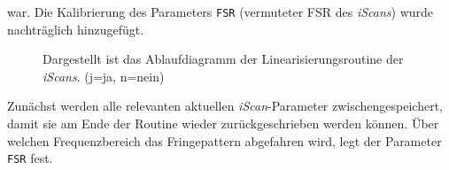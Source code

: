 war. Die Kalibrierung des Parameters \lstinline|FSR| (vermuteter FSR des
\textit{iScans}) wurde nachträglich hinzugefügt.\par
\begin{figure}[hp]
 	\centering
	\caption[Linearisierung der \textit{iScans} -
	Ablaufdiagramm]{Dargestellt ist das Ablaufdiagramm der
	Linearisierungsroutine der
	\textit{iScans}. (j=ja, n=nein)}\label{fig:linearisierung_ablaufdiagramm}
\end{figure}
Zunächst werden alle relevanten aktuellen \textit{iScan}-Parameter
zwischengespeichert, damit sie am Ende der Routine wieder zurückgeschrieben
werden können. Über welchen Frequenzbereich das Fringepattern abgefahren wird,
legt der Parameter \lstinline|FSR| fest.
